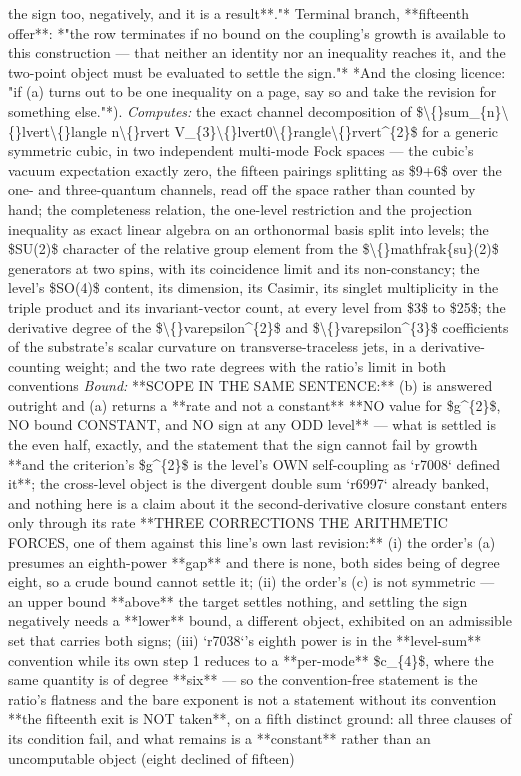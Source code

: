 \begin{description}
the sign too, negatively, and it is a result**."*  Terminal branch, **fifteenth offer**: *"the row terminates if no bound on the coupling's growth is available to this construction --- that neither an identity nor an inequality reaches it, and the two-point object must be evaluated to settle the sign."*  *And the closing licence: "if (a) turns out to be one inequality on a page, say so and take the revision for something else."*). 
\emph{Computes:} the exact channel decomposition of \$\textbackslash\{\}sum\_\{n\}\textbackslash\{\}lvert\textbackslash\{\}langle n\textbackslash\{\}rvert V\_\{3\}\textbackslash\{\}lvert0\textbackslash\{\}rangle\textbackslash\{\}rvert\textasciicircum{}\{2\}\$ for a generic symmetric cubic, in two independent multi-mode Fock spaces --- the cubic's vacuum expectation exactly zero, the fifteen pairings splitting as \$9+6\$ over the one- and three-quantum channels, read off the space rather than counted by hand; the completeness relation, the one-level restriction and the projection inequality as exact linear algebra on an orthonormal basis split into levels; the \$SU(2)\$ character of the relative group element from the \$\textbackslash\{\}mathfrak\{su\}(2)\$ generators at two spins, with its coincidence limit and its non-constancy; the level's \$SO(4)\$ content, its dimension, its Casimir, its singlet multiplicity in the triple product and its invariant-vector count, at every level from \$3\$ to \$25\$; the derivative degree of the \$\textbackslash\{\}varepsilon\textasciicircum{}\{2\}\$ and \$\textbackslash\{\}varepsilon\textasciicircum{}\{3\}\$ coefficients of the substrate's scalar curvature on transverse-traceless jets, in a derivative-counting weight; and the two rate degrees with the ratio's limit in both conventions
 \emph{Bound:}  **SCOPE IN THE SAME SENTENCE:** (b) is answered outright and (a) returns a **rate and not a constant**  **NO value for \$g\textasciicircum{}\{2\}\$, NO bound CONSTANT, and NO sign at any ODD level** --- what is settled is the even half, exactly, and the statement that the sign cannot fail by growth  **and the criterion's \$g\textasciicircum{}\{2\}\$ is the level's OWN self-coupling as `r7008` defined it**; the cross-level object is the divergent double sum `r6997` already banked, and nothing here is a claim about it  the second-derivative closure constant enters only through its rate  **THREE CORRECTIONS THE ARITHMETIC FORCES, one of them against this line's own last revision:** (i) the order's (a) presumes an eighth-power **gap** and there is none, both sides being of degree eight, so a crude bound cannot settle it; (ii) the order's (c) is not symmetric --- an upper bound **above** the target settles nothing, and settling the sign negatively needs a **lower** bound, a different object, exhibited on an admissible set that carries both signs; (iii) `r7038`'s eighth power is in the **level-sum** convention while its own step 1 reduces to a **per-mode** \$c\_\{4\}\$, where the same quantity is of degree **six** --- so the convention-free statement is the ratio's flatness and the bare exponent is not a statement without its convention  **the fifteenth exit is NOT taken**, on a fifth distinct ground: all three clauses of its condition fail, and what remains is a **constant** rather than an uncomputable object (eight declined of fifteen)

\end{description}
